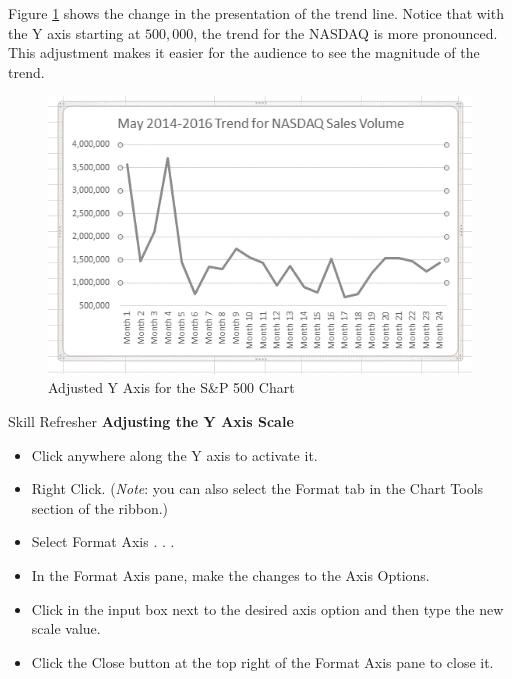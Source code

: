 Figure \ref{04:fig06} shows the change in the presentation of the trend line. Notice that with the Y axis starting at $ 500,000 $, the trend for the NASDAQ is more pronounced. This adjustment makes it easier for the audience to see the magnitude of the trend.

\begin{figure}[H]
	\centering
	\includegraphics[width=\maxwidth{.95\linewidth}]{gfx/ch04_fig06}
	\caption{Adjusted Y Axis for the S\&P 500 Chart}
	\label{04:fig06}
\end{figure}

\begin{center}
	\begin{sklbox}{Skill Refresher}
		\textbf{Adjusting the Y Axis Scale}
		\\
		\begin{itemize}
			\setlength{\itemsep}{0pt}
			\setlength{\parskip}{0pt}
			\setlength{\parsep}{0pt}

			\item Click anywhere along the Y axis to activate it.
			\item Right Click. (\textit{Note}: you can also select the Format tab in the Chart Tools section of the ribbon.)
			\item Select Format Axis . . .
			\item In the Format Axis pane, make the changes to the Axis Options.
			\item Click in the input box next to the desired axis option and then type the new scale value.
			\item Click the Close button at the top right of the Format Axis pane to close it.
			
		\end{itemize}
	\end{sklbox}
\end{center}

